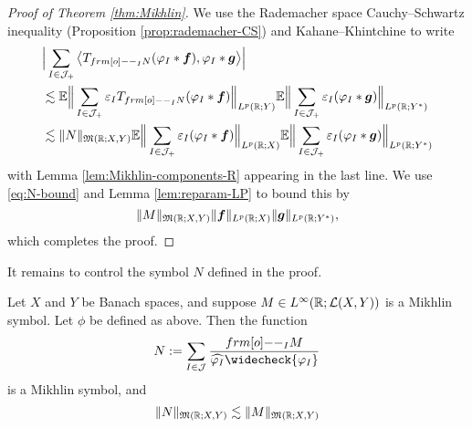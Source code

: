 \begin{proof}[Proof of Theorem \ref{thm:Mikhlin}]
We use the Rademacher space Cauchy--Schwartz inequality (Proposition \ref{prop:rademacher-CS}) and Kahane--Khintchine to write
\begin{equation*}
  \begin{aligned}
    &\Big| \sum_{I \in \mc{J}_{+}} \big\langle T_{\1_{I} N} (\phi_{I} \ast \mb{f}) , \phi_{I} \ast \mb{g} \big\rangle \Big| \\
    &\lesssim \E \Big\| \sum_{I \in \mc{J}_{+}} \varepsilon_{I} T_{\1_{I} N} (\phi_{I} \ast \mb{f}) \Big\|_{L^p(\R;Y)}
    \E \Big\| \sum_{I \in \mc{J}_{+}} \varepsilon_{I} (\phi_{I} \ast \mb{g}) \Big\|_{L^p(\R;Y^{*})} \\
    &\lesssim \|N\|_{\mf{M}(\R;X,Y)} \E \Big\| \sum_{I \in \mc{J}_{+}} \varepsilon_{I} (\phi_{I} \ast \mb{f}) \Big\|_{L^p(\R;X)}
    \E \Big\| \sum_{I \in \mc{J}_{+}} \varepsilon_{I} (\phi_{I} \ast \mb{g}) \Big\|_{L^p(\R;Y^{*})} \\
  \end{aligned}
\end{equation*}
with Lemma \ref{lem:Mikhlin-components-R} appearing in the last line.
We use \eqref{eq:N-bound} and Lemma \ref{lem:reparam-LP} to bound this by
\begin{equation*}
  \|M\|_{\mathfrak{M}(\mathbb{R};X,Y)} \| \bm{f} \|_{L^p(\mathbb{R};X)} \| \bm{g} \|_{L^p(\mathbb{R};Y^{*})},
\end{equation*}
which completes the proof.
\end{proof}

It remains to control the symbol $N$ defined in the proof.

\begin{lem}\label{lem:N-symbol}
  Let $X$ and $Y$ be Banach spaces, and suppose $M \in L^\infty(\mathbb{R};\mathcal{L}(X,Y))$ is a Mikhlin symbol.
  Let $\phi$ be defined as above.
  Then the function
  \begin{equation*}
    N := \sum_{I \in \mc{J}} \frac{\1_{I} M}{\widehat{\phi_{I}} \widecheck{\phi_{I}}}
  \end{equation*}
  is a Mikhlin symbol, and
  \begin{equation*}
    \|N\|_{\mathfrak{M}(\mathbb{R};X,Y)} \lesssim \|M\|_{\mathfrak{M}(\mathbb{R};X,Y)}
  \end{equation*}
\end{lem}

